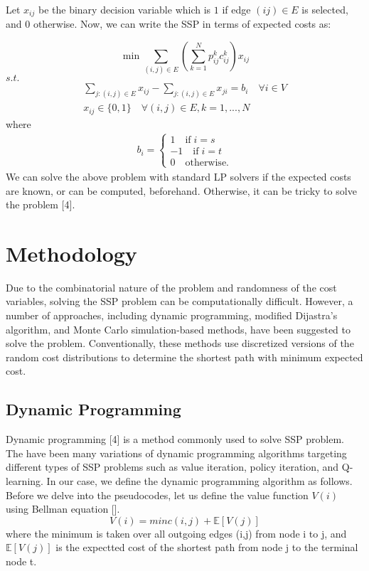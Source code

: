 \documentclass{article}
\begin{document}
Let $x_{ij}$ be the binary decision variable which is $1$ if edge $(ij) \in E$ is selected, and $0$ otherwise. Now, we can write the SSP in terms of expected costs as:

\begin{equation}\label{SSPIP}
        \min \sum_{(i,j) \in E} \left( \sum_{k=1}^N p_{ij}^k c_{ij}^k \right) x_{ij} 
    \end{equation}
    $s.t.$
    \begin{gather}
        \sum_{j:(i,j) \in E}  x_{ij} - \sum_{j:(i,j) \in E}  x_{ji} = b_i \quad \forall i \in V \label{FlowConserve}\\
        x_{ij} \in \{0,1\} \quad \forall (i,j) \in E, k={1,...,N} \label{Integrality}
    \end{gather}
where \begin{align*}
        b_i = 
        \begin{cases}
            1 \quad \text{if} \; i = s \\
            -1 \quad \text{if} \; i = t \\
            0 \quad \text{otherwise}.
        \end{cases}
    \end{align*}
We can solve the above problem with standard LP solvers if the expected costs are known, or can be computed, beforehand. Otherwise, it can be tricky to solve the problem [4]. 

\section{Methodology}
Due to the combinatorial nature of the problem and randomness of the cost variables, solving the SSP problem can
be computationally difficult. However, a number of approaches, including dynamic programming, modified 
Dijastra's algorithm, and Monte Carlo simulation-based methods, have been suggested to solve the problem.
Conventionally, these methods use discretized versions of the random cost distributions to determine the
shortest path with minimum expected cost. 

\subsection{Dynamic Programming}
Dynamic programming [4] is a method commonly used to solve SSP problem. The have been many variations of 
dynamic programming algorithms targeting different types of SSP problems such as value iteration, policy iteration,
and Q-learning. In our case, we define the dynamic programming algorithm as follows. Before 
we delve into the pseudocodes, let us define the value function $V(i)$ using Bellman equation [].
\begin{equation}
  V(i) = minc(i,j) + \mathbb{E}[V(j)]
\end{equation}
where the minimum is taken over all outgoing edges (i,j) from node i to j, and $\mathbb{E}[V(j)]$ is the expectted cost of the 
shortest path from node j to the terminal node t. 
\end{document}
